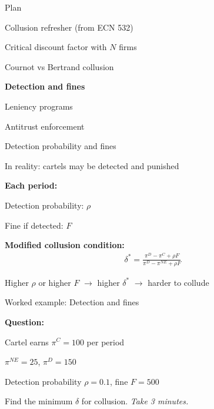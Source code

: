 \documentclass[notes,11pt, aspectratio=169]{beamer}
\newenvironment{wideitemize}{\itemize\addtolength{\itemsep}{10pt}}{\enditemize}
\newenvironment{wideenumerate}{\enumerate\addtolength{\itemsep}{10pt}}{\endenumerate}
\begin{document}

\begin{frame}{Plan}
  \begin{wideenumerate}
    \item Collusion refresher (from ECN 532)
    \item Critical discount factor with $N$ firms
    \item Cournot vs Bertrand collusion
    \item \textbf{Detection and fines}
    \item Leniency programs
    \item Antitrust enforcement
  \end{wideenumerate}
\end{frame}

\begin{frame}{Detection probability and fines}
	\begin{wideitemize}
		\item In reality: cartels may be detected and punished
		\item \textbf{Each period:}
		\begin{wideitemize}
			\vspace{5pt}
			\item Detection probability: $\rho$
			\item Fine if detected: $F$
		\end{wideitemize}
		\item \textbf{Modified collusion condition:}
		\begin{align*}
			\delta^* = \frac{\pi^D - \pi^C + \rho F}{\pi^D - \pi^{NE} + \rho F}
		\end{align*}
		\item Higher $\rho$ or higher $F$ $\rightarrow$ higher $\delta^*$ $\rightarrow$ harder to collude
	\end{wideitemize}
\end{frame}

\begin{frame}{Worked example: Detection and fines}
	\begin{wideitemize}
		\item \textbf{Question:}
		\item Cartel earns $\pi^C = 100$ per period
		\item $\pi^{NE} = 25$, $\pi^D = 150$
		\item Detection probability $\rho = 0.1$, fine $F = 500$
		\item Find the minimum $\delta$ for collusion.
	\end{wideitemize}
	\vspace{10pt}
	\centering
	\textit{Take 3 minutes.}
\end{frame}
\end{document}
